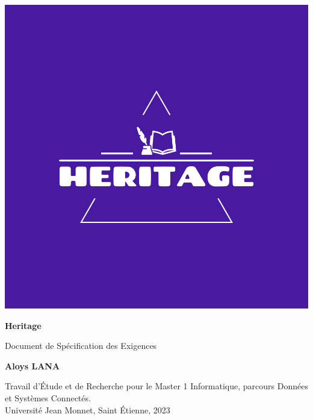 \documentclass[a4paper, 12pt]{article}
\begin{document}
    \begin{titlepage}
        \begin{center}
            \vspace*{1cm}

            \includegraphics[scale=0.07]{png/logo-color.png}

            \vspace{0.8cm}
            \Huge
            \textbf{Heritage}

            \vspace{0.5cm}
            \LARGE
            Document de Spécification des Exigences

            \vspace{1.5cm}

            \textbf{Aloys LANA}

            \vfill
            \Large
            Travail d'Étude et de Recherche pour le Master 1 Informatique, parcours Données et Systèmes
            Connectés.\\

            \vspace{1cm}
            \large
            Université Jean Monnet, Saint Étienne, 2023
        \end{center}
    \end{titlepage}
\end{document}
